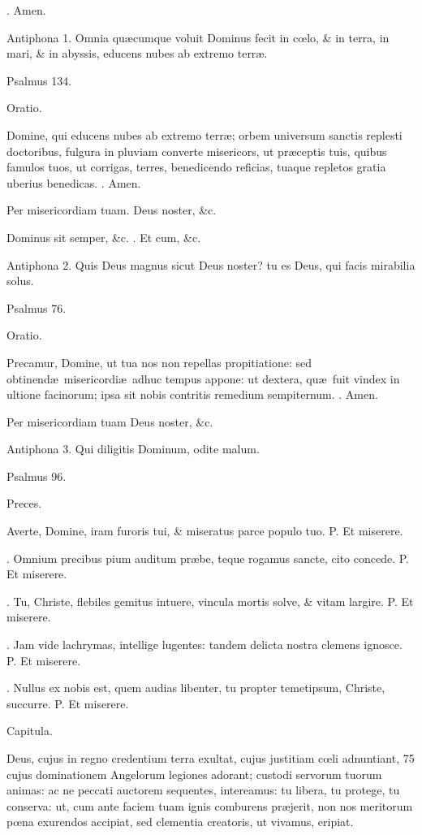 \documentclass[letter,11pt]{book}
\makeatletter
\DeclareRobustCommand{\Vbar}{\vers@resp{-0.1em}{V}}
\DeclareRobustCommand{\Rbar}{\vers@resp{0pt}{R}}
\newcommand{\vers@resp@sym}{\raisebox{0.2ex}{\rotatebox[origin=c]{-20}{$\m@th\rceil$}}}
\newcommand{\vers@resp}[2]{%
  {\ooalign{\hidewidth\kern#1\vers@resp@sym\hidewidth\cr#2\cr}}%
}%
\def\P{\color{Red} P. \color{black}}
\def\V{\color{Red} \Vbar . \color{black}}
\def\R{\color{Red} \Rbar . \color{black}}
\makeatother
\begin{document}
\begin{multicols*}{2}
\R Amen.

Antiphona 1. Omnia qu\ae cumque voluit Dominus fecit in c\oe lo, \& in terra, in mari, \& in abyssis, educens nubes ab extremo terr\ae .

Psalmus 134.

Oratio.

Domine, qui educens nubes ab extremo terr\ae ; orbem universum sanctis replesti doctoribus, fulgura in pluviam converte misericors, ut pr\ae ceptis tuis, quibus famulos tuos, ut corrigas, terres, benedicendo reficias, tuaque repletos gratia uberius benedicas.
\R Amen.

Per misericordiam tuam. Deus noster, \&c.

Dominus sit semper, \&c.
\R Et cum, \&c.

Antiphona 2. Quis Deus magnus sicut Deus noster? tu es Deus, qui facis mirabilia solus.

Psalmus 76.

Oratio.

Precamur, Domine, ut tua nos non repellas propitiatione: sed obtinend\ae \ misericordi\ae \ adhuc tempus appone: ut dextera, qu\ae \ fuit vindex in ultione facinorum; ipsa sit nobis contritis remedium sempiternum.
\R Amen.

Per misericordiam tuam Deus noster, \&c.

Antiphona 3. Qui diligitis Dominum, odite malum.

Psalmus 96.

Preces.

Averte, Domine, iram furoris tui, \& miseratus parce populo tuo.
\P Et miserere.

\V Omnium precibus pium auditum pr\ae be, teque rogamus sancte, cito concede.
\P Et miserere.

\V Tu, Christe, flebiles gemitus intuere, vincula mortis solve, \& vitam largire.
\P Et miserere.

\V Jam vide lachrymas, intellige lugentes: tandem delicta nostra clemens ignosce.
\P Et miserere.

\V Nullus ex nobis est, quem audias libenter, tu propter temetipsum, Christe, succurre.
\P Et miserere.

Capitula.

Deus, cujus in regno credentium terra exultat, cujus justitiam c\oe li adnuntiant, 75 cujus dominationem Angelorum legiones adorant; custodi servorum tuorum animas: ac ne peccati auctorem sequentes, intereamus: tu libera, tu protege, tu conserva: ut, cum ante faciem tuam ignis comburens pr\ae jerit, non nos meritorum p\oe na exurendos accipiat, sed clementia creatoris, ut vivamus, eripiat.


\end{multicols*}
\end{document}
